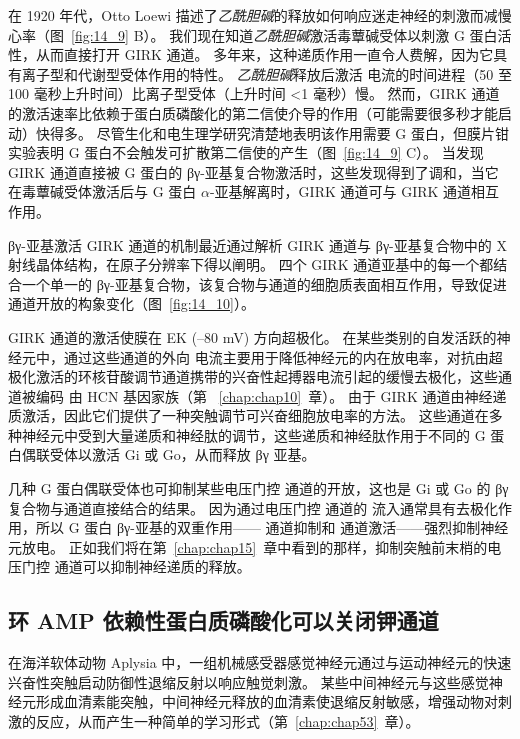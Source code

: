 在 1920 年代，Otto Loewi 描述了\textit{乙酰胆碱}的释放如何响应迷走神经的刺激而减慢心率（图~\ref{fig:14_9} B）。
我们现在知道\textit{乙酰胆碱}激活毒蕈碱受体以刺激 G 蛋白活性，从而直接打开 GIRK 通道。
多年来，这种递质作用一直令人费解，因为它具有离子型和代谢型受体作用的特性。
\textit{乙酰胆碱}释放后激活  电流的时间进程（50 至 100 毫秒上升时间）比离子型受体（上升时间 <1 毫秒）慢。
然而，GIRK 通道的激活速率比依赖于蛋白质磷酸化的第二信使介导的作用（可能需要很多秒才能启动）快得多。 
尽管生化和电生理学研究清楚地表明该作用需要 G 蛋白，但膜片钳实验表明 G 蛋白不会触发可扩散第二信使的产生（图~\ref{fig:14_9} C）。
当发现 GIRK 通道直接被 G 蛋白的 βγ-亚基复合物激活时，这些发现得到了调和，当它在毒蕈碱受体激活后与 G 蛋白 $\alpha$-亚基解离时，GIRK 通道可与 GIRK 通道相互作用。


βγ-亚基激活 GIRK 通道的机制最近通过解析 GIRK 通道与 βγ-亚基复合物中的 X 射线晶体结构，在原子分辨率下得以阐明。
四个 GIRK 通道亚基中的每一个都结合一个单一的 βγ-亚基复合物，该复合物与通道的细胞质表面相互作用，导致促进通道开放的构象变化（图~\ref{fig:14_10}）。


GIRK 通道的激活使膜在 EK (–80 mV) 方向超极化。 
在某些类别的自发活跃的神经元中，通过这些通道的外向  电流主要用于降低神经元的内在放电率，对抗由超极化激活的环核苷酸调节通道携带的兴奋性起搏器电流引起的缓慢去极化，这些通道被编码 由 HCN 基因家族（第 ~\ref{chap:chap10}~章）。
由于 GIRK 通道由神经递质激活，因此它们提供了一种突触调节可兴奋细胞放电率的方法。
这些通道在多种神经元中受到大量递质和神经肽的调节，这些递质和神经肽作用于不同的 G 蛋白偶联受体以激活 Gi 或 Go，从而释放 βγ 亚基。


几种 G 蛋白偶联受体也可抑制某些电压门控  通道的开放，这也是 Gi 或 Go 的 βγ 复合物与通道直接结合的结果。
因为通过电压门控  通道的  流入通常具有去极化作用，所以 G 蛋白 βγ-亚基的双重作用—— 通道抑制和  通道激活——强烈抑制神经元放电。
正如我们将在第~\ref{chap:chap15}~章中看到的那样，抑制突触前末梢的电压门控  通道可以抑制神经递质的释放。



\subsection{环 AMP 依赖性蛋白质磷酸化可以关闭钾通道}

在海洋软体动物 Aplysia 中，一组机械感受器感觉神经元通过与运动神经元的快速兴奋性突触启动防御性退缩反射以响应触觉刺激。
某些中间神经元与这些感觉神经元形成血清素能突触，中间神经元释放的血清素使退缩反射敏感，增强动物对刺激的反应，从而产生一种简单的学习形式（第~\ref{chap:chap53}~章）。


